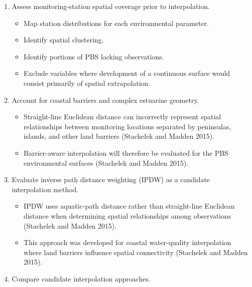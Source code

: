 \documentclass[
  letterpaper,
  DIV=11,
  numbers=noendperiod]{scrartcl}
\providecommand{\tightlist}{%
  \setlength{\itemsep}{0pt}\setlength{\parskip}{0pt}}
\begin{document}
\begin{enumerate}
  \begin{enumerate}
  \def\labelenumii{\arabic{enumii}.}
  \tightlist
  \item
    Assess monitoring-station spatial coverage prior to interpolation.

    \begin{itemize}
    \tightlist
    \item
      Map station distributions for each environmental parameter.
    \item
      Identify spatial clustering.
    \item
      Identify portions of PBS lacking observations.
    \item
      Exclude variables where development of a continuous surface would
      consist primarily of spatial extrapolation.
    \end{itemize}
  \item
    Account for coastal barriers and complex estuarine geometry.

    \begin{itemize}
    \tightlist
    \item
      Straight-line Euclidean distance can incorrectly represent spatial
      relationships between monitoring locations separated by
      peninsulas, islands, and other land barriers (Stachelek and Madden
      2015).
    \item
      Barrier-aware interpolation will therefore be evaluated for the
      PBS environmental surfaces (Stachelek and Madden 2015).
    \end{itemize}
  \item
    Evaluate inverse path distance weighting (IPDW) as a candidate
    interpolation method.

    \begin{itemize}
    \tightlist
    \item
      IPDW uses aquatic-path distance rather than straight-line
      Euclidean distance when determining spatial relationships among
      observations (Stachelek and Madden 2015).
    \item
      This approach was developed for coastal water-quality
      interpolation where land barriers influence spatial connectivity
      (Stachelek and Madden 2015).
    \end{itemize}
  \item
    Compare candidate interpolation approaches.


\end{enumerate}
\end{enumerate}
\end{document}
